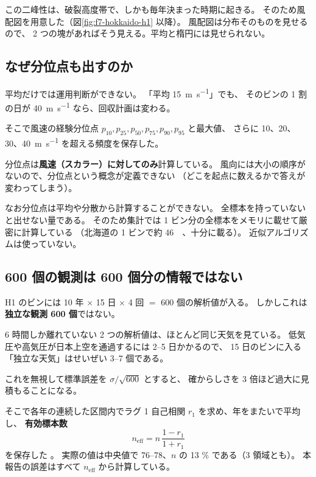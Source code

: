 この二峰性は、破裂高度帯で、しかも毎年決まった時期に起きる。
そのため風配図を用意した（図\ref{fig:f7-hokkaido-h1} 以降）。
風配図は分布そのものを見せるので、
2 つの塊があればそう見える。平均と楕円には見せられない。

\subsection{なぜ分位点も出すのか}

平均だけでは運用判断ができない。
「平均 \SI{15}{\metre\per\second}」でも、
そのビンの 1 割の日が \SI{40}{\metre\per\second} なら、回収計画は変わる。

そこで風速の経験分位点 $p_{10}, p_{25}, p_{50}, p_{75}, p_{90}, p_{95}$ と最大値、
さらに \SI{10}{}、\SI{20}{}、\SI{30}{}、\SI{40}{\metre\per\second} を超える頻度を保存した。

分位点は\textbf{風速（スカラー）に対してのみ}計算している。
風向には大小の順序がないので、分位点という概念が定義できない
（どこを起点に数えるかで答えが変わってしまう）。

なお分位点は平均や分散から計算することができない。
全標本を持っていないと出せない量である。
そのため集計では 1 ビン分の全標本をメモリに載せて厳密に計算している
（北海道の 1 ビンで約 \SI{46}{\mega\byte}、十分に載る）。
近似アルゴリズムは使っていない。

\subsection{600 個の観測は 600 個分の情報ではない}
\label{sec:neff}

H1 のビンには 10 年 $\times$ 15 日 $\times$ 4 回 $=$ 600 個の解析値が入る。
しかしこれは\textbf{独立な観測 600 個}ではない。

6 時間しか離れていない 2 つの解析値は、ほとんど同じ天気を見ている。
低気圧や高気圧が日本上空を通過するには 2--5 日かかるので、
15 日のビンに入る「独立な天気」はせいぜい 3--7 個である。

これを無視して標準誤差を $\sigma/\sqrt{600}$ とすると、
確からしさを 3 倍ほど過大に見積もることになる。

そこで各年の連続した区間内でラグ 1 自己相関 $r_1$ を求め、年をまたいで平均し、
\textbf{有効標本数}
\begin{equation}
  n_\mathrm{eff} = n\,\frac{1 - r_1}{1 + r_1}
\end{equation}
を保存した \citep{wilks2011statistical}。
実際の値は中央値で 76--78、$n$ の 13 \% である（3 領域とも）。
本報告の誤差はすべて $n_\mathrm{eff}$ から計算している。

